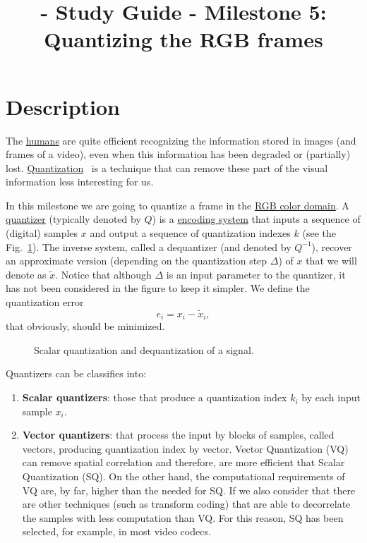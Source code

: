 
\title{\SM{} - Study Guide - Milestone 5: Quantizing the RGB frames}

\maketitle

\section{Description}
The \href{https://en.wikipedia.org/wiki/Visual_system}{humans} are
quite efficient recognizing the information stored in images (and
frames of a video), even when this information has been degraded or
(partially)
lost. \href{https://en.wikipedia.org/wiki/Quantization_(signal_processing)}{Quantization}~\cite{sayood2017introduction,vetterli2014foundations}
is a technique that can remove these part of the visual information
less interesting for us.

In this milestone we are going to quantize a frame in
the \href{https://en.wikipedia.org/wiki/RGB_color_model}{RGB color
domain}. A \href{https://en.wikipedia.org/wiki/Quantization_(signal_processing)}{quantizer}
(typically denoted by $Q$) is
a \href{https://en.wikipedia.org/wiki/Data_compression}{encoding
system} that inputs a sequence of (digital) samples $x$ and output a
sequence of quantization indexes $k$ (see the Fig.~\ref{fig:Q}). The
inverse system, called a dequantizer (and denoted by $Q^{-1}$),
recover an approximate version (depending on the quantization step
$\Delta$) of $x$ that we will denote as $\tilde{x}$. Notice that
although $\Delta$ is an input parameter to the quantizer, it has not
been considered in the figure to keep it simpler. We define the
quantization error
\begin{equation}
  e_i = x_i - \tilde{x}_i,
\end{equation}
that obviously, should be minimized.

\begin{figure}
  \centering
  \caption{Scalar quantization and dequantization of a signal.}
  \label{fig:Q}
\end{figure}

Quantizers can be classifies into:
\begin{enumerate}
\item \textbf{Scalar quantizers}: those that produce a quantization
  index $k_i$ by each input sample $x_i$.
\item \textbf{Vector quantizers}: that process the input by
  blocks of samples, called vectors, producing quantization index by
  vector. Vector Quantization (VQ) can remove spatial correlation and
  therefore, are more efficient that Scalar Quantization (SQ). On the
  other hand, the computational requirements of VQ are, by far, higher
  than the needed for SQ. If we also consider that there are other
  techniques (such as transform coding) that are able to decorrelate
  the samples with less computation than VQ. For this reason, SQ has
  been selected, for example, in most video codecs.
\end{enumerate}

